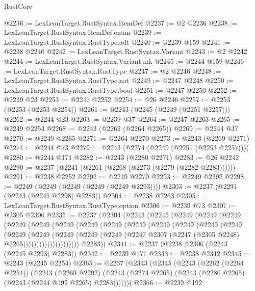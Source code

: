 \begin{lexlean}{RustCore}
\begin{coremodule}
@2236 := LexLeanTarget.RustSyntax.ItemDef
@2237 := @2 @2236
@2238 := LexLeanTarget.RustSyntax.ItemDef.enum
@2239 := LexLeanTarget.RustSyntax.RustType.adt
@2240 := @2239 @159
@2241 := @2238 @2240
@2242 := LexLeanTarget.RustSyntax.Variant
@2243 := @2 @2242
@2244 := LexLeanTarget.RustSyntax.Variant.mk
@2245 := @2244 @159
@2246 := LexLeanTarget.RustSyntax.RustType
@2247 := @2 @2246
@2248 := LexLeanTarget.RustSyntax.RustType.nat
@2249 := @2247 @2248
@2250 := LexLeanTarget.RustSyntax.RustType.bool
@2251 := @2247 @2250
@2252 := @2239 @23
@2253 := @2247 @2252
@2254 := @26 @2246
@2257 := @2253 (@2253 (@2253 @2254))
@2261 := @2243 (@2245 (@2249 (@2251 @2257)))
@2262 := @2244 @23
@2263 := @2239 @37
@2264 := @2247 @2263
@2265 := @2249 @2254
@2268 := @2243 (@2262 (@2264 @2265))
@2269 := @2244 @37
@2270 := @2249 @2265
@2271 := @2264 @2270
@2273 := @2243 (@2269 @2271)
@2274 := @2244 @73
@2279 := @2243 (@2274 (@2249 (@2251 (@2253 @2257))))
@2280 := @2244 @171
@2282 := @2243 (@2280 @2271)
@2283 := @26 @2242
@2290 := @2237 (@2241 (@2261 (@2268 (@2273 (@2279 (@2282 @2283))))))
@2291 := @2238 @2252
@2292 := @2249 @2270
@2293 := @2249 @2292
@2298 := @2249 (@2249 (@2249 (@2249 (@2249 @2293))))
@2303 := @2237 (@2291 (@2243 (@2245 @2298) @2283))
@2304 := @2238 @2263
@2305 := LexLeanTarget.RustSyntax.RustType.option
@2306 := @2239 @73
@2307 := @2305 @2306
@2335 := @2237
    (@2304
      (@2243
        (@2245
          (@2249
            (@2249
              (@2249
                (@2249
                  (@2249
                    (@2249
                      (@2249
                        (@2249
                          (@2249
                            (@2249
                              (@2249
                                (@2249
                                  (@2249
                                    (@2249
                                      (@2249
                                        (@2249
                                          (@2249
                                            (@2249
                                              (@2247
                                                @2307
                                                (@2247 (@2305 @2248) @2265)))))))))))))))))))))
        @2283))
@2341 := @2237 (@2238 @2306 (@2243 (@2245 @2293) @2283))
@2342 := @2239 @171
@2343 := @2238 @2342
@2345 := @2243 (@2245 @2254)
@2365 := @2237
    (@2343
      (@2345
        (@2243
          (@2262 (@2264 @2254))
          (@2243
            (@2269 @2292)
            (@2243 (@2274 @2265) (@2243 (@2280 @2265) (@2243 (@2244 @192 @2265) @2283)))))))
@2366 := @2239 @192

\end{coremodule}
\end{lexlean}
